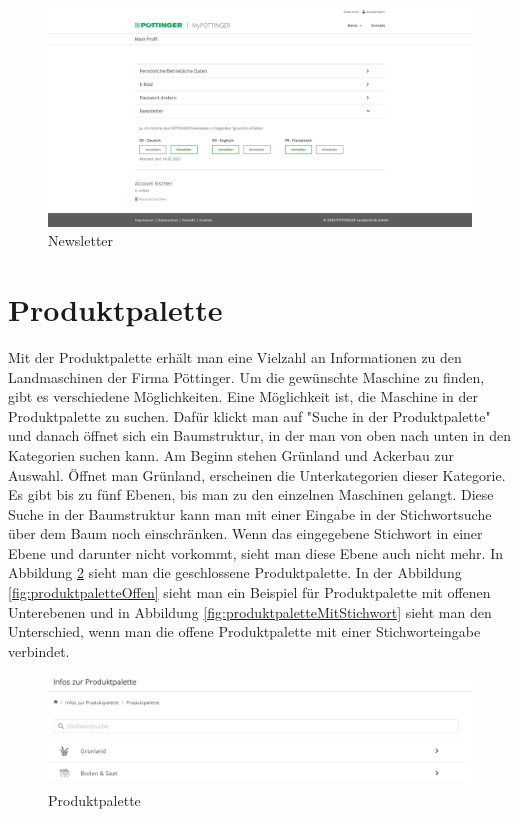 \begin{figure}[H]
	\centerline{
		\includegraphics[width=1\textwidth, frame]{./grafiken/erm_profil_newsletter.png}
	}
	\vskip0pt
	\caption{Newsletter} \label{fig:newsletter}
\end{figure}

\section{Produktpalette}

Mit der Produktpalette erhält man eine Vielzahl an Informationen zu den Landmaschinen der Firma Pöttinger. Um die gewünschte Maschine zu finden, gibt es verschiedene Möglichkeiten. Eine Möglichkeit ist, die Maschine in der Produktpalette zu suchen. Dafür klickt man auf "Suche in der Produktpalette" und danach öffnet sich ein Baumstruktur, in der man von oben nach unten in den Kategorien suchen kann. Am Beginn stehen Grünland und Ackerbau zur Auswahl. Öffnet man Grünland, erscheinen die Unterkategorien dieser Kategorie. Es gibt bis zu fünf Ebenen, bis man zu den einzelnen Maschinen gelangt. Diese Suche in der Baumstruktur kann man mit einer Eingabe in der Stichwortsuche über dem Baum noch einschränken. Wenn das eingegebene Stichwort in einer Ebene und darunter nicht vorkommt, sieht man diese Ebene auch nicht mehr. In Abbildung \ref{fig:produktpalette} sieht man die geschlossene Produktpalette. In der Abbildung \ref{fig:produktpaletteOffen} sieht man ein Beispiel für Produktpalette mit offenen Unterebenen und in Abbildung \ref{fig:produktpaletteMitStichwort} sieht man den Unterschied, wenn man die offene Produktpalette mit einer Stichworteingabe verbindet.

\begin{figure}[H]
	\centerline{
		\includegraphics[width=1\textwidth, frame]{./grafiken/erm_produktpalette_neu_.png}
	}
	\vskip0pt
	\caption{Produktpalette} \label{fig:produktpalette}
\end{figure}

